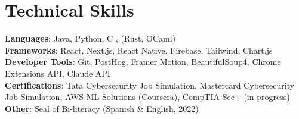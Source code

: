 \documentclass[letterpaper,11pt]{article}
\begin{document}
\section{Technical Skills}
  \begin{itemize}[leftmargin=0.15in, label={}]
    \small{\item{
      \textbf{Languages}{: Java, Python, C , (Rust, OCaml)} \\
      \textbf{Frameworks}{: React, Next.js, React Native, Firebase, Tailwind, Chart.js} \\
      \textbf{Developer Tools}{: Git, PostHog, Framer Motion, BeautifulSoup4, Chrome Extensions API, Claude API} \\
      \textbf{Certifications}{: Tata Cybersecurity Job Simulation, Mastercard Cybersecurity Job Simulation, AWS ML Solutions (Coursera), CompTIA Sec+ (in progress)}\\
      \textbf{Other}{: Seal of Bi-literacy (Spanish \& English, 2022)}
    }}
  \end{itemize}

\end{document}
